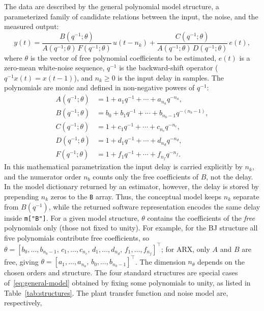 \documentclass[acmsmall,screen,review]{acmart}
\begin{document}
The data are described by the general polynomial model structure, a
parameterized family of candidate relations between the input, the noise,
and the measured output:
\begin{equation}
    y(t) = \frac{B(q^{-1};\theta)}{A(q^{-1};\theta)\,F(q^{-1};\theta)}\,u(t-n_k)
           + \frac{C(q^{-1};\theta)}{A(q^{-1};\theta)\,D(q^{-1};\theta)}\,e(t),
    \label{eq:general-model}
\end{equation}
where $\theta$ is the vector of free polynomial coefficients to be estimated,
$e(t)$ is a zero-mean white-noise sequence, $q^{-1}$ is the
backward-shift operator ($q^{-1}x(t) = x(t-1)$),
and $n_k \geq 0$ is the input delay in samples.
The polynomials are monic and defined in non-negative powers of $q^{-1}$:
\begin{align*}
    A(q^{-1};\theta) &= 1 + a_1 q^{-1} + \cdots + a_{n_a} q^{-n_a}, \\
    B(q^{-1};\theta) &= b_0 + b_1 q^{-1} + \cdots + b_{n_b-1}q^{-(n_b-1)}, \\
    C(q^{-1};\theta) &= 1 + c_1 q^{-1} + \cdots + c_{n_c} q^{-n_c}, \\
    D(q^{-1};\theta) &= 1 + d_1 q^{-1} + \cdots + d_{n_d} q^{-n_d}, \\
    F(q^{-1};\theta) &= 1 + f_1 q^{-1} + \cdots + f_{n_f} q^{-n_f}.
\end{align*}
In this mathematical parametrization the input delay is carried explicitly by
\(n_k\), and the numerator order \(n_b\) counts only the free coefficients of
\(B\), not the delay.  In the model dictionary returned by an estimator,
however, the delay is stored by prepending \(n_k\) zeros to the \texttt{B}
array.  Thus, the conceptual model keeps \(n_k\) separate from \(B(q^{-1})\),
while the returned software representation encodes the same delay inside
\texttt{m["B"]}.
For a given model structure, $\theta$ contains the coefficients of the
\emph{free} polynomials only (those not fixed to unity).  For example, for
the BJ structure all five polynomials contribute free coefficients, so
$\theta = [b_0,\ldots,b_{n_b-1},\,c_1,\ldots,c_{n_c},\,
           d_1,\ldots,d_{n_d},\,f_1,\ldots,f_{n_f}]^\top$;
for ARX, only $A$ and $B$ are free, giving
$\theta = [a_1,\ldots,a_{n_a},\,b_0,\ldots,b_{n_b-1}]^\top$.
The dimension $n_\theta$ depends on the chosen orders and structure.
The four standard structures are special cases of~\eqref{eq:general-model}
obtained by fixing some polynomials to unity, as listed in
Table~\ref{tab:structures}.
The plant transfer function and noise model are, respectively,
\end{document}
